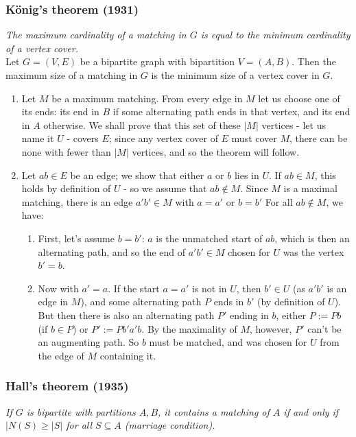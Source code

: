 \subsubsection{König's theorem (1931)} 

\textit{The maximum cardinality of a matching in $G$ is equal to the minimum cardinality of a vertex cover.}\\

Let $G = (V,E)$ be a bipartite graph with bipartition $V = (A, B)$. Then the maximum size of a matching in $G$ is the minimum size of a vertex cover in $G$.
	\begin{enumerate}
		\item Let $M$ be a maximum matching. From every edge in $M$ let us choose one of its ends: its end in $B$ if some alternating path ends in that vertex, and its end in $A$ otherwise. We shall prove that this set of these $|M|$ vertices - let us name it $U$ - covers $E$; since any vertex cover of $E$ must cover $M$, there can be none with fewer than $|M|$ vertices, and so the theorem will follow.
		\item Let $ab \in E$ be an edge; we show that either $a$ or $b$ lies in $U$. If $ab \in M$, this holds by definition of $U$ - so we assume that $ab \notin M$. Since $M$ is a maximal matching, there is an edge $a'b' \in M$ with $a = a'$ or $b = b'$ For all $ab \notin M$, we have:
			\begin{enumerate} 
				\item First, let's assume $b = b'$: $a$ is the unmatched start of $ab$, which is then an alternating path, and so the end of $a'b' \in M$ chosen for $U$ was the vertex $b' = b$.
				\item Now with $a' = a$. If the start $a = a'$  is not in $U$, then $b' \in U$ (as $a'b'$ is an edge in $M$), and some alternating path $P$ ends in $b'$ (by definition of $U$). But then there is also an alternating path $P'$ ending in $b$, either $P := Pb$ (if $b \in P$) or $P' := Pb'a'b$. By the maximality of $M$, however, $P'$ can't be an augmenting path. So $b$ must be matched, and was chosen for $U$ from the edge of $M$ containing it.
			\end{enumerate}
	\end{enumerate}
	
\subsubsection{Hall's theorem (1935)} 

\textit{If $G$ is bipartite with partitions $A,B$, it contains a matching of $A$ if and only if $|N(S) \geq |S|$ for all $S \subseteq A$ (marriage condition).}\\

